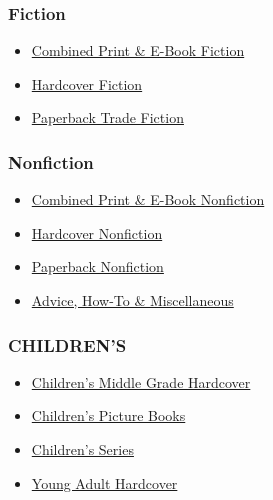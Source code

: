 \hypertarget{fiction}{%
\subsubsection{Fiction}\label{fiction}}

\begin{itemize}
\tightlist
\item
  \href{/books/best-sellers/combined-print-and-e-book-fiction/}{Combined
  Print \& E-Book Fiction}
\item
  \href{/books/best-sellers/hardcover-fiction/}{Hardcover Fiction}
\item
  \href{/books/best-sellers/trade-fiction-paperback/}{Paperback Trade
  Fiction}
\end{itemize}

\hypertarget{nonfiction}{%
\subsubsection{Nonfiction}\label{nonfiction}}

\begin{itemize}
\tightlist
\item
  \href{/books/best-sellers/combined-print-and-e-book-nonfiction/}{Combined
  Print \& E-Book Nonfiction}
\item
  \href{/books/best-sellers/hardcover-nonfiction/}{Hardcover Nonfiction}
\item
  \href{/books/best-sellers/paperback-nonfiction/}{Paperback Nonfiction}
\item
  \href{/books/best-sellers/advice-how-to-and-miscellaneous/}{Advice,
  How-To \& Miscellaneous}
\end{itemize}

\hypertarget{childrens}{%
\subsubsection{CHILDREN'S}\label{childrens}}

\begin{itemize}
\tightlist
\item
  \href{/books/best-sellers/childrens-middle-grade-hardcover/}{Children's
  Middle Grade Hardcover}
\item
  \href{/books/best-sellers/picture-books/}{Children's Picture Books}
\item
  \href{/books/best-sellers/series-books/}{Children's Series}
\item
  \href{/books/best-sellers/young-adult-hardcover/}{Young Adult
  Hardcover}
\end{itemize}

